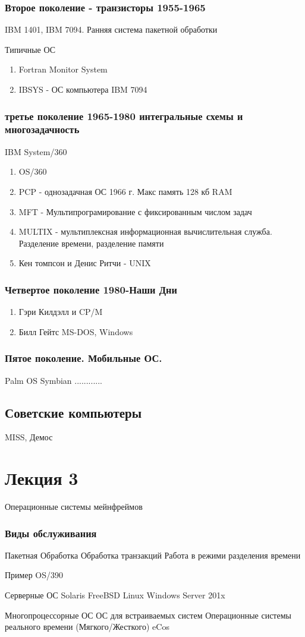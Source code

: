\documentclass[a4paper]{article}
\begin{document}
\subsubsection{Второе поколение - транзисторы 1955-1965}
IBM 1401,
IBM 7094.
Ранняя система пакетной обработки

Типичные ОС
\begin{enumerate}
\item Fortran Monitor System
\item IBSYS - ОС компьютера IBM 7094
\end{enumerate}

\subsubsection{третье поколение 1965-1980 интегральные схемы и многозадачность}
IBM System/360

\begin{enumerate}
\item OS/360
\item PCP - однозадачная ОС 1966 г. Макс память 128 кб RAM
\item MFT - Мультипрограмирование с фиксированным числом задач
\item MULTIX - мультиплексная информационная вычислительная служба. Разделение времени, разделение памяти
\item Кен томпсон и Денис Ритчи - UNIX
\end{enumerate}

\subsubsection{Четвертое поколение 1980-Наши Дни} 
\begin{enumerate}
\item Гэри Килдэлл и CP/M
\item Билл Гейтс MS-DOS, Windows
\end{enumerate}

\subsubsection{Пятое поколение. Мобильные ОС.}
Palm OS
Symbian
............

\subsection{Советские компьютеры}
MISS, Демос

\section{Лекция 3}
Операционные системы мейнфреймов
\subsubsection{Виды обслуживания} 
Пакетная Обработка
Обработка транзакций
Работа в режими разделения времени

Пример OS/390

Серверные ОС
Solaris
FreeBSD
Linux
Windows Server 201x

Многопроцессорные ОС
ОС для встраиваемых систем
Операционные системы реального времени (Мягкого/Жесткого) eCos
\end{document}
